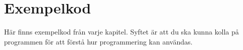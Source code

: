 
\appendix
\chapter{Exempelkod}
Här finns exempelkod från varje kapitel. Syftet är att du ska kunna kolla på programmen för att förstå hur programmering kan användas. 


\newpage

\newpage

\newpage

\newpage

\newpage

\newpage

\newpage

\newpage

\newpage

\newpage

\newpage

\newpage

